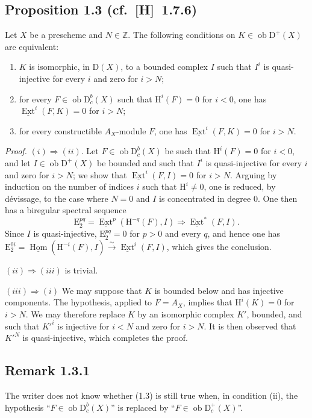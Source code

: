 \documentclass[11pt]{article}
\renewcommand{\H}{\mathrm{H}}
\DeclareMathOperator{\Hom}{Hom}
\DeclareMathOperator{\Ext}{Ext}
\newcommand{\D}{\mathrm{D}}
\newcommand{\Z}{\mathbb{Z}}
\newcommand{\E}{\mathrm{E}}
\newcommand{\ob}{\operatorname{ob}}
\begin{document}
\subsection*{Proposition 1.3 {\normalfont (cf.~[H]~1.7.6)}}
Let $X$ be a prescheme and $N \in \Z$. The following conditions on $K \in \ob \D^{+}(X)$ are equivalent:
\begin{enumerate}[label=(\roman*)]
\item $K$ is isomorphic, in $\D(X)$, to a bounded complex $I$ such that $I^i$ is quasi-injective for every $i$ and zero for $i > N$;
\item for every $F \in \ob \D_c^{b}(X)$ such that $\H^i(F) = 0$ for $i < 0$, one has $\underline{\Ext}^i(F,K) = 0$ for $i > N$;
\item for every constructible $A_X$-module $F$, one has $\underline{\Ext}^i(F,K) = 0$ for $i > N$.
\end{enumerate}

\emph{Proof.} $(i) \Rightarrow (ii)$. Let $F \in \ob \D_c^{b}(X)$ be such that $\H^i(F) = 0$ for $i < 0$, and let $I \in \ob \D^{+}(X)$ be bounded and such that $I^i$ is quasi-injective for every $i$ and zero for $i > N$; we show that $\underline{\Ext}^i(F,I) = 0$ for $i > N$. Arguing by induction on the number of indices $i$ such that $\H^i \neq 0$, one is reduced, by dévissage, to the case where $N = 0$ and $I$ is concentrated in degree $0$. One then has a biregular spectral sequence
\[
\E_2^{pq} = \underline{\Ext}^p(\H^{-q}(F),I) \Rightarrow \underline{\Ext}^{*}(F,I).
\]
Since $I$ is quasi-injective, $\E_2^{pq} = 0$ for $p > 0$ and every $q$, and hence one has $\E_2^{0i} = \underline{\Hom}(\H^{-i}(F),I) \xrightarrow{\sim} \underline{\Ext}^i(F,I)$, which gives the conclusion.

$(ii) \Rightarrow (iii)$ is trivial.

$(iii) \Rightarrow (i)$ We may suppose that $K$ is bounded below and has injective components. The hypothesis, applied to $F = A_X$, implies that $\H^i(K) = 0$ for $i > N$. We may therefore replace $K$ by an isomorphic complex $K'$, bounded, and such that $K'^i$ is injective for $i < N$ and zero for $i > N$. It is then observed that $K'^N$ is quasi-injective, which completes the proof.

\subsection*{Remark 1.3.1}
The writer does not know whether (1.3) is still true when, in condition (ii), the hypothesis ``$F \in \ob \D_c^{b}(X)$'' is replaced by ``$F \in \ob \D_c^{+}(X)$''.
\end{document}
